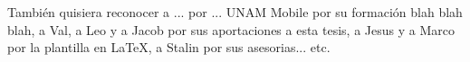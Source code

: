 
\begin{acknowledgements}

También quisiera reconocer a ... por ... UNAM Mobile por su formación blah blah blah, a Val, a Leo y a Jacob por sus aportaciones a esta tesis, a Jesus y a Marco por la plantilla en LaTeX, a Stalin por sus asesorias... etc.
\blindtext %
\end{acknowledgements}




